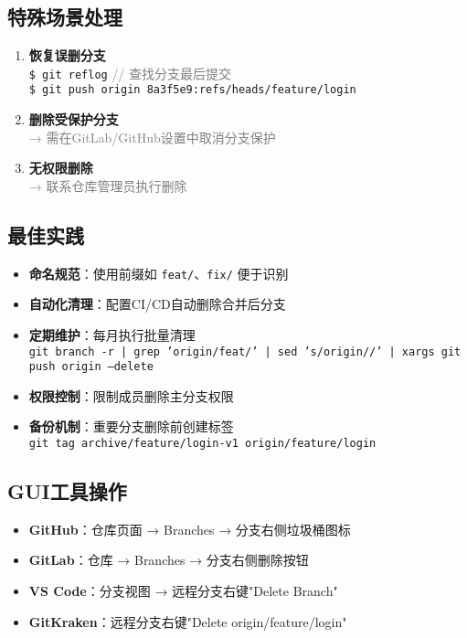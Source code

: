\subsection{特殊场景处理}
\begin{enumerate}[leftmargin=*, nosep]
    \item \textbf{恢复误删分支} \\
    \texttt{\$ git reflog} \quad \textcolor{gray}{// 查找分支最后提交} \\
    \texttt{\$ git push origin 8a3f5e9:refs/heads/feature/login}
    
    \item \textbf{删除受保护分支} \\
    \textcolor{gray}{→ 需在GitLab/GitHub设置中取消分支保护}
    
    \item \textbf{无权限删除} \\
    \textcolor{gray}{→ 联系仓库管理员执行删除}
\end{enumerate}

\subsection{最佳实践}
\begin{itemize}[leftmargin=*, nosep]
    \item \textbf{命名规范}：使用前缀如 \texttt{feat/}、\texttt{fix/} 便于识别
    \item \textbf{自动化清理}：配置CI/CD自动删除合并后分支
    \item \textbf{定期维护}：每月执行批量清理 \\
    \texttt{git branch -r | grep 'origin/feat/' | sed 's/origin\///' | xargs git push origin --delete}
    
    \item \textbf{权限控制}：限制成员删除主分支权限
    \item \textbf{备份机制}：重要分支删除前创建标签 \\
    \texttt{git tag archive/feature/login-v1 origin/feature/login}
\end{itemize}

\subsection{GUI工具操作}
\begin{itemize}[leftmargin=*, nosep]
    \item \textbf{GitHub}：仓库页面 → Branches → 分支右侧垃圾桶图标
    \item \textbf{GitLab}：仓库 → Branches → 分支右侧删除按钮
    \item \textbf{VS Code}：分支视图 → 远程分支右键"Delete Branch"
    \item \textbf{GitKraken}：远程分支右键"Delete origin/feature/login"
\end{itemize}

